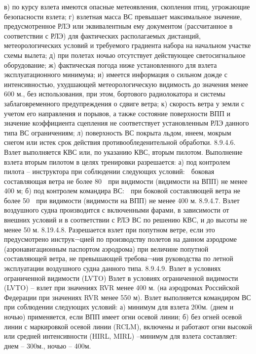 в)	по курсу взлета имеются опасные метеоявления, скопления птиц, угрожающие безопасности взлета; 
г)	взлетная масса ВС превышает максимальное значение, предусмотренное РЛЭ или эквивалентным ему документом (рассчитанное в соответствии с РЛЭ) для фактических располагаемых дистанций, метеорологических условий и требуемого градиента набора на начальном участке схемы вылета; 
д)	при полетах ночью отсутствует действующее светосигнальное оборудование; 
ж)  фактическая погода ниже установленного для взлета эксплуатационного минимума; 
и)  имеется информация о сильном дожде с интенсивностью, ухудшающей метеорологическую видимость до значения менее 600 м., без использования, при этом, бортового радиолокатора и системы заблаговременного предупреждения о сдвиге ветра; 
к)  скорость ветра у земли с учетом его направления и порывов, а также состояние поверхности ВПП и значение коэффициента сцепления не соответствует установленным РЛЭ данного типа ВС ограничениям; 
л) поверхность ВС покрыта льдом, инеем, мокрым снегом или истек срок действия противообледенительной обработки. 
8.9.4.6. Взлет выполняется КВС или, по указанию КВС, вторым пилотом.
Выполнение взлета вторым пилотом в целях тренировки разрешается:
а)	под контролем пилота – инструктора при соблюдении следующих условий:
	боковая составляющая ветра не более 80%
	при видимости (видимости на ВПП) не менее 400 м;
б)	под контролем командира ВС:
	при боковой составляющей ветра не более 50%
	при видимости (видимости на ВПП) не менее 400 м.
8.9.4.7. Взлет воздушного судна производится с включенными фарами, в зависимости от внешних условий и в соответствии с РЛЭ ВС по решению КВС, и до высоты не менее 50 м. 
8.19.4.8. Разрешается взлет при попутном ветре, если это предусмотрено инструк¬цией по производству полетов на данном аэродроме (аэронавигационным паспортом аэродрома) при величине попутной составляющей ветра, не превышающей требова¬ния руководства по летной эксплуатации воздушного судна данного типа.
8.9.4.9.	Взлет в условиях ограниченной видимости (LVTO)
Взлет в условиях ограниченной видимости (LVTO) – взлет при значениях RVR менее 400 м. (на аэродромах Российской Федерации при значениях RVR менее 550 м).
Взлет выполняется командиром ВС при соблюдении следующих условий:
а)	минимум для взлета 200м. (днем и ночью) применяется, если ВПП имеет огни осевой линии;
б)	без огней осевой линии с маркировкой осевой линии (RCLM), включены и работают огни высокой или средней интенсивности (HIRL, MIRL) –минимум для взлета составляет: днем – 300м., ночью – 400м. 
